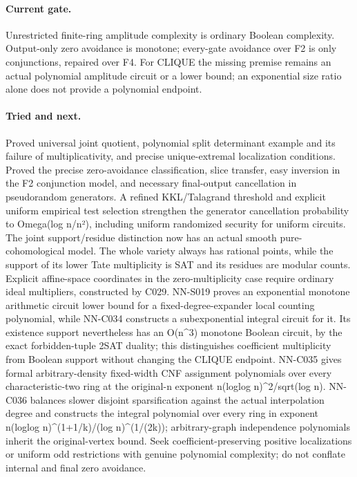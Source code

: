 \paragraph{Current gate.} Unrestricted finite-ring amplitude complexity is ordinary Boolean complexity. Output-only zero avoidance is monotone; every-gate avoidance over F2 is only conjunctions, repaired over F4. For CLIQUE the missing premise remains an actual polynomial amplitude circuit or a lower bound; an exponential size ratio alone does not provide a polynomial endpoint.
\paragraph{Tried and next.} Proved universal joint quotient, polynomial split determinant example and its failure of multiplicativity, and precise unique-extremal localization conditions. Proved the precise zero-avoidance classification, slice transfer, easy inversion in the F2 conjunction model, and necessary final-output cancellation in pseudorandom generators. A refined KKL/Talagrand threshold and explicit uniform empirical test selection strengthen the generator cancellation probability to Omega(log n/n²), including uniform randomized security for uniform circuits. The joint support/residue distinction now has an actual smooth pure-cohomological model. The whole variety always has rational points, while the support of its lower Tate multiplicity is SAT and its residues are modular counts. Explicit affine-space coordinates in the zero-multiplicity case require ordinary ideal multipliers, constructed by C029. NN-S019 proves an exponential monotone arithmetic circuit lower bound for a fixed-degree-expander local counting polynomial, while NN-C034 constructs a subexponential integral circuit for it. Its existence support nevertheless has an O(n\textasciicircum{}3) monotone Boolean circuit, by the exact forbidden-tuple 2SAT duality; this distinguishes coefficient multiplicity from Boolean support without changing the CLIQUE endpoint. NN-C035 gives formal arbitrary-density fixed-width CNF assignment polynomials over every characteristic-two ring at the original-n exponent n(loglog n)\textasciicircum{}2/sqrt(log n). NN-C036 balances slower disjoint sparsification against the actual interpolation degree and constructs the integral polynomial over every ring in exponent n(loglog n)\textasciicircum{}(1+1/k)/(log n)\textasciicircum{}(1/(2k)); arbitrary-graph independence polynomials inherit the original-vertex bound. Seek coefficient-preserving positive localizations or uniform odd restrictions with genuine polynomial complexity; do not conflate internal and final zero avoidance.

